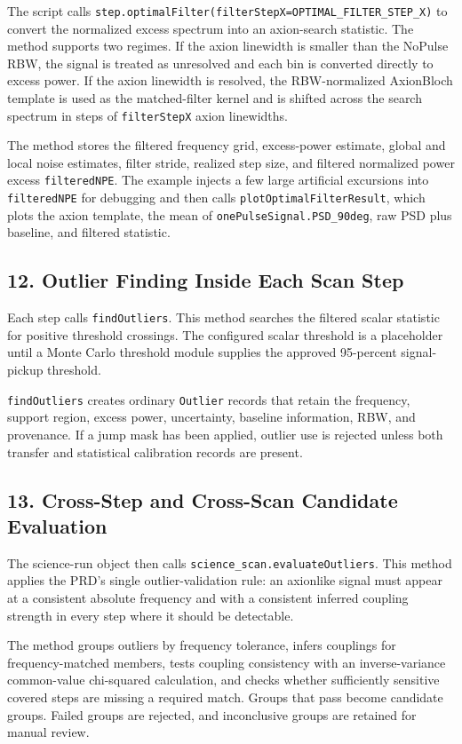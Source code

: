 \documentclass[11pt]{article}
\newcommand{\code}[1]{\texttt{#1}}
\begin{document}
The script calls \code{step.optimalFilter(filterStepX=OPTIMAL\_FILTER\_STEP\_X)}
to convert the normalized excess spectrum into an axion-search statistic.
The method supports two regimes. If the axion linewidth is smaller than the
NoPulse RBW, the signal is treated as unresolved and each bin is converted
directly to excess power. If the axion linewidth is resolved, the
RBW-normalized AxionBloch template is used as the matched-filter kernel and is
shifted across the search spectrum in steps of \code{filterStepX} axion
linewidths.

The method stores the filtered frequency grid, excess-power estimate,
global and local noise estimates, filter stride, realized step size, and
filtered normalized power excess \code{filteredNPE}. The example injects a few
large artificial excursions into \code{filteredNPE} for debugging and then
calls \code{plotOptimalFilterResult}, which plots the axion template, the mean
of \code{onePulseSignal.PSD\_90deg}, raw PSD plus baseline, and filtered
statistic.

\subsection{12. Outlier Finding Inside Each Scan Step}

Each step calls \code{findOutliers}. This method searches the filtered scalar
statistic for positive threshold crossings. The configured scalar threshold is
a placeholder until a Monte Carlo threshold module supplies the approved
95-percent signal-pickup threshold.

\code{findOutliers} creates ordinary \code{Outlier} records that retain the
frequency, support region, excess power, uncertainty, baseline information,
RBW, and provenance. If a jump mask has been applied, outlier use is rejected
unless both transfer and statistical calibration records are present.

\subsection{13. Cross-Step and Cross-Scan Candidate Evaluation}

The science-run object then calls \code{science\_scan.evaluateOutliers}. This
method applies the PRD's single outlier-validation rule: an axionlike signal
must appear at a consistent absolute frequency and with a consistent inferred
coupling strength in every step where it should be detectable.

The method groups outliers by frequency tolerance, infers couplings for
frequency-matched members, tests coupling consistency with an inverse-variance
common-value chi-squared calculation, and checks whether sufficiently sensitive
covered steps are missing a required match. Groups that pass become candidate
groups. Failed groups are rejected, and inconclusive groups are retained for
manual review.
\end{document}
